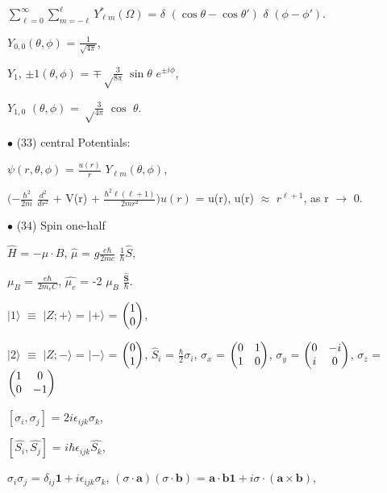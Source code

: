 \documentclass[a4paper, 10pt, onepage]{elegantbook}
\begin{document}
{$\sum_{\ell = 0}^\infty \sum_{m = - \ell}^\ell Y^*_{\ell m} (\Omega)$ = $\delta$ $(\cos\theta - \cos\theta')$ $\delta$ 
$(\phi - \phi')$.  

$Y_{0,0}(\theta, \phi)$ = $\frac{1} {\sqrt{4 \pi}}$,  

$Y_1$, $\pm 1 (\theta, \phi)$ = $\mp {\sqrt \frac{3}{8 \pi}}$ $\sin \theta$ $e^{\pm i \phi}$, 

$Y_{1,0}$ $(\theta, \phi)$ = ${\sqrt \frac{3}{4 \pi}}$ $\cos$ $\theta$. 

$\bullet$ (33) central Potentials:  

$\psi(r, \theta, \phi)$ = $\frac{u(r)}{r}$ $Y_{\ell m}(\theta, \phi)$,  

$ (- {\frac{\hbar^2}{2m}}$ $ \frac{d^2}{dr^2}$ + V(r) + $\frac{\hbar^2 \ell (\ell + 1)} {2mr^2}) u(r) $ = u(r), u(r) 
$\approx$ $r^{\ell + 1}$, as r $\longrightarrow$ 0.  

$\bullet$ (34) Spin one-half 

$\hat{H}$ = $- \mu \cdot B$, $\hat{\mu}$ = $ g \frac{e \hbar}{2mc}$ $\frac{1}{\hbar} \hat{S}$,  

$\mu_B$ = $\frac{e \hbar}{2m_eC}$, $ \hat{\mu_e}$ = -2 $ \mu_B$ $\frac{\hat{\mathbf S}}{\hbar}$.  

$\mid 1 \rangle$ $\equiv$ $\mid Z; + \rangle$ = $\mid + \rangle$ = $\begin{pmatrix}1\cr0\cr\end{pmatrix}$,  

$\mid 2 \rangle$ $\equiv$ $\mid Z; - \rangle$ = $\mid - \rangle$ = $\begin{pmatrix}0\cr1\cr\end{pmatrix}$, 
$\hat{S}_i$ = $\frac{\hbar}{2} \sigma_i$, $\sigma_x$ = $\begin{pmatrix}0 & 1\cr 1 & 0\cr\end{pmatrix}$, 
$\sigma_y$ = $\begin{pmatrix}0 & -i\cr i & 0\cr\end{pmatrix}$, $\sigma_z$ = $\begin{pmatrix}1 & 0\cr 0 & 
-1\cr\end{pmatrix}$  

$[\sigma_i, \sigma_j]$ = $2i \epsilon_{ijk} \sigma_k$,  

$[\hat{S_i}, \hat{S_j}]$ = $i \hbar \epsilon_{ijk} \hat{S_k}$,  

$\sigma_i \sigma_j$ = $\delta_{ij} \mathbf{1} + i \epsilon_{ijk} \sigma_k$, $(\sigma \cdot \mathbf{a} ) (\sigma \cdot 
\mathbf{b} )$ = $\mathbf{a} \cdot \mathbf{b} \mathbf{1} + i \sigma \cdot (\mathbf{a} \times \mathbf{b})$, 

}
\end{document}
